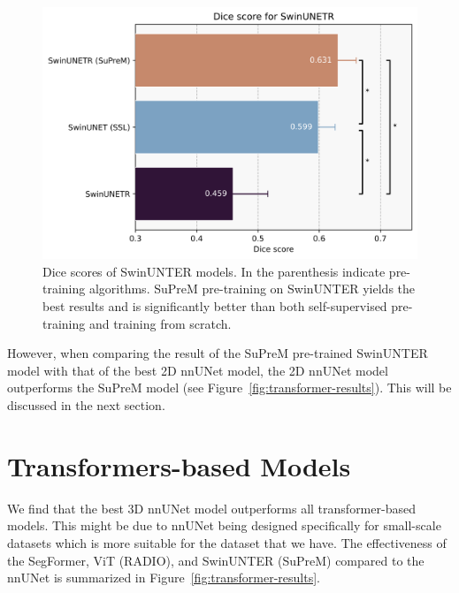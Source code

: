 \documentclass[a4paper,11pt,oneside]{report}
\begin{document}
\begin{figure}[hbt]
    \centering
    \includegraphics[width=0.5\linewidth]{figures/result_SwinUNETR_results.png}
    \caption{Dice scores of SwinUNTER models. In the parenthesis indicate pre-training algorithms. SuPreM pre-training on SwinUNTER yields the best results and is significantly better than both self-supervised pre-training and training from scratch.}
    \label{fig:suprem-results}
\end{figure}

However, when comparing the result of the SuPreM pre-trained SwinUNTER model with that of the best 2D nnUNet model, the 2D nnUNet model outperforms the SuPreM model (see Figure~\ref{fig:transformer-results}). This will be discussed in the next section.

\section{Transformers-based Models}
We find that the best 3D nnUNet model outperforms all transformer-based models. This might be due to nnUNet being designed specifically for small-scale datasets which is more suitable for the dataset that we have.
The effectiveness of the SegFormer, ViT (RADIO), and SwinUNTER (SuPreM) compared to the nnUNet is summarized in Figure~\ref{fig:transformer-results}.
\end{document}

